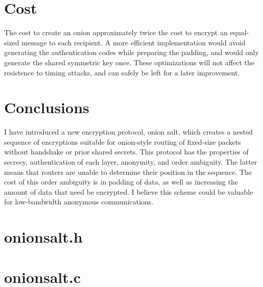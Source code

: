 \documentclass[letterpaper,twocolumn,amsmath,amssymb,pre,aps,10pt]{revtex4-1}
\begin{document}
\section{Cost}

The cost to create an onion approximately twice the cost to encrypt an
equal-sized message to each recipient.  A more efficient
implementation would avoid generating the authentication codes while
preparing the padding, and would only generate the shared symmetric
key once.  These optimizations will not affect the resistence to
timing attacks, and can safely be left for a later improvement.

\section{Conclusions}

I have introduced a new encryption protocol, onion salt, which creates
a nested sequence of encryptions suitable for onion-style routing of
fixed-size packets without handshake or prior shared secrets.  This
protocol has the properties of secrecy, authentication of each layer,
anonymity, and order ambiguity.  The latter means that routers are
unable to determine their position in the sequence.  The cost of this
order ambiguity is in padding of data, as well as increasing the
amount of data that need be encrypted.  I believe this scheme could be
valuable for low-bandwidth anonymous communications.




\appendix

\begin{widetext}

\section{onionsalt.h}



\section{onionsalt.c}



\end{widetext}
\end{document}
